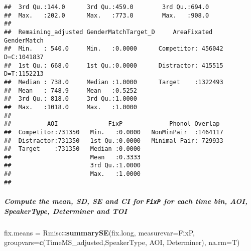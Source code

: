 \documentclass[
]{article}
\newenvironment{Shaded}{\begin{snugshade}}{\end{snugshade}}
\newcommand{\AttributeTok}[1]{\textcolor[rgb]{0.13,0.29,0.53}{#1}}
\newcommand{\FunctionTok}[1]{\textcolor[rgb]{0.13,0.29,0.53}{\textbf{#1}}}
\newcommand{\NormalTok}[1]{#1}
\newcommand{\OtherTok}[1]{\textcolor[rgb]{0.56,0.35,0.01}{#1}}
\newcommand{\SpecialCharTok}[1]{\textcolor[rgb]{0.81,0.36,0.00}{\textbf{#1}}}
\newcommand{\StringTok}[1]{\textcolor[rgb]{0.31,0.60,0.02}{#1}}
\begin{document}
\begin{verbatim}
##  3rd Qu.:144.0      3rd Qu.:459.0        3rd Qu.:694.0        
##  Max.   :202.0      Max.   :773.0        Max.   :908.0        
##                                                               
##  Remaining_adjusted GenderMatchTarget_D     AreaFixated      GenderMatch  
##  Min.   : 540.0     Min.   :0.0000      Competitor: 456042   D=C:1041837  
##  1st Qu.: 668.0     1st Qu.:0.0000      Distractor: 415515   D=T:1152213  
##  Median : 738.0     Median :1.0000      Target    :1322493                
##  Mean   : 748.9     Mean   :0.5252                                        
##  3rd Qu.: 818.0     3rd Qu.:1.0000                                        
##  Max.   :1018.0     Max.   :1.0000                                        
##                                                                           
##          AOI              FixP             Phonol_Overlap   
##  Competitor:731350   Min.   :0.0000   NonMinPair  :1464117  
##  Distractor:731350   1st Qu.:0.0000   Minimal Pair: 729933  
##  Target    :731350   Median :0.0000                         
##                      Mean   :0.3333                         
##                      3rd Qu.:1.0000                         
##                      Max.   :1.0000                         
## 
\end{verbatim}

\subparagraph{\texorpdfstring{Compute the mean, SD, SE and CI for
\texttt{FixP} for each time bin, AOI, SpeakerType, Determiner and
TOI}{Compute the mean, SD, SE and CI for FixP for each time bin, AOI, SpeakerType, Determiner and TOI}}\label{compute-the-mean-sd-se-and-ci-for-fixp-for-each-time-bin-aoi-speakertype-determiner-and-toi}

\begin{Shaded}
\begin{Highlighting}[]
\NormalTok{fix.means }\OtherTok{=}\NormalTok{ Rmisc}\SpecialCharTok{::}\FunctionTok{summarySE}\NormalTok{(fix.long, }\AttributeTok{measurevar=}\StringTok{\textquotesingle{}FixP\textquotesingle{}}\NormalTok{, }\AttributeTok{groupvars=}\FunctionTok{c}\NormalTok{(}\StringTok{\textquotesingle{}TimeMS\_adjusted\textquotesingle{}}\NormalTok{,}\StringTok{\textquotesingle{}SpeakerType\textquotesingle{}}\NormalTok{, }\StringTok{\textquotesingle{}AOI\textquotesingle{}}\NormalTok{, }\StringTok{\textquotesingle{}Determiner\textquotesingle{}}\NormalTok{), }\AttributeTok{na.rm=}\NormalTok{T)}
\end{Highlighting}
\end{Shaded}
\end{document}
